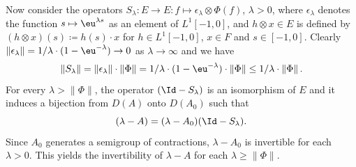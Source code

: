 Now consider the operators $S_{\lambda} \colon E \to E \colon f \mapsto \epsilon_{\lambda} \otimes \Phi(f)$, $\lambda > 0$, where $\epsilon_{\lambda}$ denotes the function $s \mapsto \eu^{\lambda s}$ as an element of\/ $L^{1}[-1,0]$, 
and $h \otimes x \in E$ is defined by 
$(h \otimes x)(s) \coloneqq h(s) \cdot x$ for $h \in L^{1}[-1,0]$, $x \in F$ and $s \in [-1,0]$.
Clearly 
$\|\epsilon_{\lambda}\| = 1/\lambda \cdot (1 - \eu^{-\lambda}) \to 0$ as $\lambda \to \infty$ and we have
\[
\|S_{\lambda}\| = \|\epsilon_{\lambda}\| \cdot \|\Phi\| = 1/\lambda \cdot (1 - \eu^{-\lambda}) \cdot \|\Phi\| \leq 1/\lambda \cdot \|\Phi\|\,.
\]
For every $\lambda > \|\Phi\|$, the operator $(\Id - S_{\lambda})$ is an isomorphism of\/ $E$ and it induces a bijection from $D(A)$ onto $D(A_{0})$ such that
\begin{equation}\label{eq:c4-3.2}
(\lambda - A) = (\lambda - A_{0})(\Id - S_{\lambda}).
\end{equation}
Since $A_{0}$ generates a semigroup of contractions, $\lambda - A_{0}$ is invertible for each $\lambda > 0$.
This yields the invertibility of\/ $\lambda - A$ for each $\lambda \geq \|\Phi\|$.

